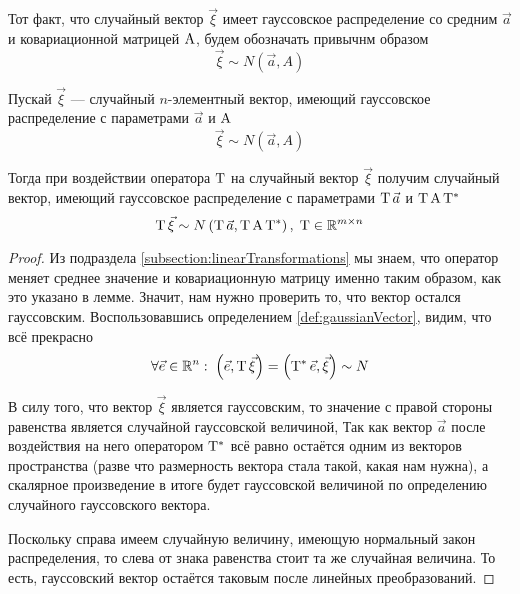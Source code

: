 \begin{definition}
    Тот факт, что случайный вектор $\vec{\xi}$ имеет гауссовское распределение
    со средним $\vec{a}$ и ковариационной матрицей
    $\mathrm{A}$, будем обозначать привычнм образом
    $$\vec{\xi} \sim N\left( \vec{a}, A \right)$$
\end{definition}

\begin{lemma}\label{lemma:gaussTransformed}
    Пускай $\vec{\xi}$ --- случайный $n$-элементный вектор, имеющий гауссовское
    распределение с параметрами $\vec{a}$ и $\mathrm{A}$
    $$\vec{\xi} \sim N\left( \vec{a}, A \right)$$

    Тогда при воздействии оператора $\mathrm{T}$ на случайный вектор
    $\vec{\xi}$ получим случайный вектор, имеющий гауссовское распределение с
    параметрами $\mathrm{T}\, {\vec{a}}$ и
    $\mathrm{T}\, {\mathrm{A}\, {\mathrm{T^*}}}$
    $$\mathrm{T}\, {\vec{\xi}} \sim N\left( \mathrm{T}\, {\vec{a}},
        \mathrm{T}\, {\mathrm{A}\, {\mathrm{T^*}}} \right),\;
        \mathrm{T} \in \mathbb{R}^{m \times n}$$
\end{lemma}
\begin{proof}
    Из подраздела \ref{subsection:linearTransformations} мы знаем, что оператор
    меняет среднее значение и ковариационную матрицу именно таким образом, как
    это указано в лемме. Значит, нам нужно проверить то, что вектор остался
    гауссовским. Воспользовавшись определением \ref{def:gaussianVector}, видим,
    что всё прекрасно
    $$\forall \vec{e} \in \mathbb{R}^n:\;
        \left( \vec{e}, \mathrm{T}\, {\vec{\xi}} \right)
            = \left( \mathrm{T^*}\, {\vec{e}}, \vec{\xi} \right) \sim N$$

    В силу того, что вектор $\vec{\xi}$ является гауссовским, то значение с
    правой стороны равенства является случайной гауссовской величиной, Так как
    вектор $\vec{a}$ после воздействия на него оператором $\mathrm{T^*}$ всё
    равно остаётся одним из векторов пространства (разве что размерность вектора
    стала такой, какая нам нужна), а скалярное произведение в итоге будет
    гауссовской величиной по определению случайного гауссовского вектора.

    Поскольку справа имеем случайную величину, имеющую нормальный закон
    распределения, то слева от знака равенства стоит та же случайная величина.
    То есть, гауссовский вектор остаётся таковым после линейных преобразований.
\end{proof}

